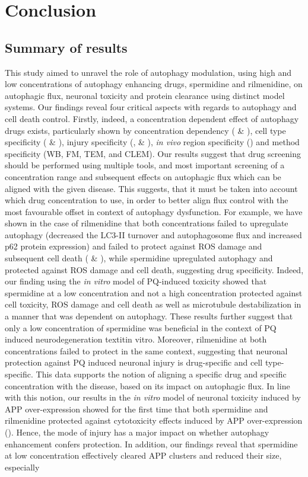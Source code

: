 \chapter{Conclusion}
\section{Summary of results}
This study aimed to unravel the role of autophagy modulation, using high and low concentrations of autophagy enhancing drugs, spermidine and rilmenidine, on autophagic flux, neuronal toxicity and protein clearance using distinct model systems. Our findings reveal four critical aspects with regards to autophagy and cell death control. Firstly, indeed, a concentration dependent effect of autophagy drugs exists, particularly shown by concentration dependency ( \& ), cell type specificity ( \& ), injury specificity (,  \& ), \textit{in vivo} region specificity () and method specificity (WB, FM, TEM, and CLEM). Our results suggest that drug screening should be performed using multiple tools, and most important screening of a concentration range and subsequent effects on autophagic flux which can be aligned with the given disease. This suggests, that it must be taken into account which drug concentration to use, in order to better align flux control with the most favourable offset in context of autophagy dysfunction. For example, we have shown in the case of rilmenidine that both concentrations failed to upregulate autophagy (decreased the LC3-II turnover and autophagosome flux and increased p62 protein expression) and failed to protect against ROS damage and subsequent cell death ( \& ), while spermidine upregulated autophagy and protected against ROS damage and cell death, suggesting drug specificity. Indeed, our finding using the \textit{in vitro} model of PQ-induced toxicity showed that spermidine at a low concentration and not a high concentration protected against cell toxicity, ROS damage and cell death as well as microtubule destabilization in a manner that was dependent on autophagy. These results further suggest that only a low concentration of spermidine was beneficial in the context of PQ induced neurodegeneration textit{in vitro}. Moreover, rilmenidine at both concentrations failed to protect in the same context, suggesting that neuronal protection against PQ induced neuronal injury is drug-specific and cell type-specific. This data supports the notion of  aligning a specific drug and specific concentration with the disease, based on its impact on autophagic flux. In line with this notion, our results in the \textit{in vitro} model of neuronal toxicity induced by APP over-expression showed for the first time that both spermidine and rilmenidine protected against cytotoxicity effects induced by APP over-expression (). Hence, the mode of injury has a major impact on whether autophagy enhancement  confers protection. In addition, our findings reveal that spermidine at low concentration effectively cleared APP clusters and reduced their size, especially 